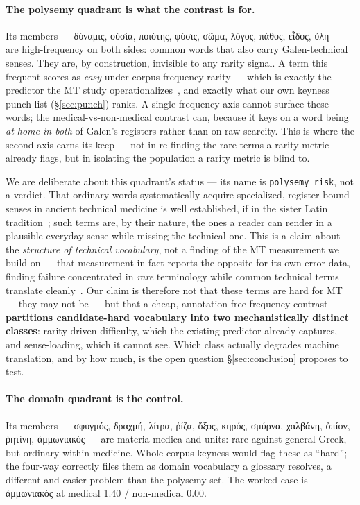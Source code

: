 \documentclass[11pt]{article}
\begin{document}
\paragraph{The polysemy quadrant is what the contrast is for.}
Its members --- δύναμις, οὐσία, ποιότης, φύσις, σῶμα, λόγος, πάθος, εἶδος, ὕλη --- are high-frequency
on both sides: common words that also carry Galen-technical senses. They are, by construction,
invisible to any rarity signal. A term this frequent scores as \textit{easy} under corpus-frequency
rarity --- which is exactly the predictor the MT study operationalizes~\citep{galen-mt-mqm-2026}, and
exactly what our own keyness punch list (\S\ref{sec:punch}) ranks. A single frequency axis cannot
surface these words; the medical-vs-non-medical contrast can, because it keys on a word being
\textit{at home in both} of Galen's registers rather than on raw scarcity. This is where the second
axis earns its keep --- not in re-finding the rare terms a rarity metric already flags, but in
isolating the population a rarity metric is blind to.

We are deliberate about this quadrant's status --- its name is \texttt{polysemy\_risk}, not a verdict.
That ordinary words systematically acquire specialized, register-bound senses in ancient technical
medicine is well established, if in the sister Latin tradition~\citep[ch.~3]{langslow-2000}; such
terms are, by their nature, the ones a reader can render in a plausible everyday sense while missing
the technical one. This is a claim about the \textit{structure of technical vocabulary}, not a finding
of the MT measurement we build on --- that measurement in fact reports the opposite for its own error
data, finding failure concentrated in \textit{rare} terminology while common technical terms translate
cleanly~\citep{galen-mt-mqm-2026}. Our claim is therefore not that these terms are hard for MT ---
they may not be --- but that a cheap, annotation-free frequency contrast \textbf{partitions
candidate-hard vocabulary into two mechanistically distinct classes}: rarity-driven difficulty, which
the existing predictor already captures, and sense-loading, which it cannot see. Which class actually
degrades machine translation, and by how much, is the open question \S\ref{sec:conclusion} proposes
to test.

\paragraph{The domain quadrant is the control.}
Its members --- σφυγμός, δραχμή, λίτρα, ῥίζα, ὄξος, κηρός,
σμύρνα, χαλβάνη, ὀπίον, ῥητίνη, ἀμμωνιακός --- are materia medica and units: rare against general
Greek, but ordinary within medicine. Whole-corpus keyness would flag these as ``hard''; the four-way
correctly files them as domain vocabulary a glossary resolves, a different and easier problem than
the polysemy set. The worked case is ἀμμωνιακός at medical 1.40 / non-medical 0.00.
\end{document}
